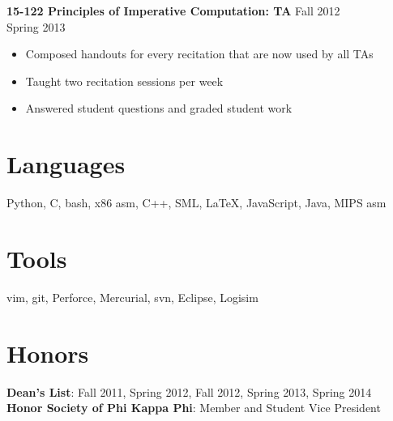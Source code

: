 \documentclass[margin]{res}
\begin{document}
\begin{resume}
  \textbf{15-122 Principles of Imperative Computation: TA}
    \hfill Fall 2012\\ \hphantom{1em} \hfill Spring 2013

  \vspace{-1em}\vspace{-1ex}
  \begin{itemize} \itemsep -2pt
    \item Composed handouts for every recitation that are now used by all TAs
    \item Taught two recitation sessions per week
    \item Answered student questions and graded student work
  \end{itemize}

\section{Languages}
  Python, C, bash, x86 asm, C++, SML, \LaTeX, JavaScript, Java, MIPS asm

\section{Tools}
  vim, git, Perforce, Mercurial, svn, Eclipse, Logisim

\section{Honors}
  \textbf{Dean's List}: Fall 2011, Spring 2012, Fall 2012, Spring 2013, Spring 2014 \\
  \textbf{Honor Society of Phi Kappa Phi}: Member and Student Vice President

\end{resume}
\end{document}
